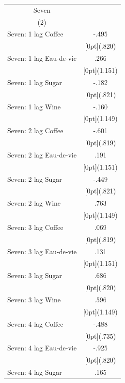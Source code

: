 \documentclass[12pt,a4paper,titlepage]{article}
\begin{document}
{\newpage
{}
\begin{tabular*}{\textwidth}{@{\extracolsep{\fill}}lc}	
	\multicolumn{1}{c}{Seven} \\
\cline{2-2}	
	\multicolumn{1}{c}{(2)} \\
\hline	
Seven: 1 lag Coffee &	-.495 \\
&	\raisebox{.7ex}[0pt]{\scriptsize (.820)} \\
Seven: 1 lag Eau-de-vie &	.266 \\
&	\raisebox{.7ex}[0pt]{\scriptsize (1.151)} \\
Seven: 1 lag Sugar &	-.182 \\
&	\raisebox{.7ex}[0pt]{\scriptsize (.821)} \\
Seven: 1 lag Wine &	-.160 \\
&	\raisebox{.7ex}[0pt]{\scriptsize (1.149)} \\
Seven: 2 lag Coffee &	-.601 \\
&	\raisebox{.7ex}[0pt]{\scriptsize (.819)} \\
Seven: 2 lag Eau-de-vie &	.191 \\
&	\raisebox{.7ex}[0pt]{\scriptsize (1.151)} \\
Seven: 2 lag Sugar &	-.449 \\
&	\raisebox{.7ex}[0pt]{\scriptsize (.821)} \\
Seven: 2 lag Wine &	.763 \\
&	\raisebox{.7ex}[0pt]{\scriptsize (1.149)} \\
Seven: 3 lag Coffee &	.069 \\
&	\raisebox{.7ex}[0pt]{\scriptsize (.819)} \\
Seven: 3 lag Eau-de-vie &	.131 \\
&	\raisebox{.7ex}[0pt]{\scriptsize (1.151)} \\
Seven: 3 lag Sugar &	.686 \\
&	\raisebox{.7ex}[0pt]{\scriptsize (.820)} \\
Seven: 3 lag Wine &	.596 \\
&	\raisebox{.7ex}[0pt]{\scriptsize (1.149)} \\
Seven: 4 lag Coffee &	-.488 \\
&	\raisebox{.7ex}[0pt]{\scriptsize (.735)} \\
Seven: 4 lag Eau-de-vie &	-.925 \\
&	\raisebox{.7ex}[0pt]{\scriptsize (.820)} \\
Seven: 4 lag Sugar &	.165 \\

\end{tabular*}}
\end{document}
